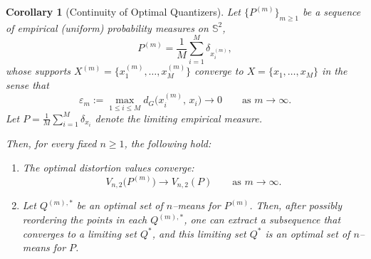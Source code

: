 \documentclass[12pt, reqno]{amsart}
\theoremstyle{plain}
\newtheorem{corollary}[subsection]{Corollary}
\theoremstyle{definition}
\begin{document}
\begin{corollary}[Continuity of Optimal Quantizers]\label{cor:continuity-optimal}
Let $\{P^{(m)}\}_{m\ge 1}$ be a sequence of empirical (uniform) probability measures on $\mathbb{S}^2$,
\[
P^{(m)}=\frac{1}{M}\sum_{i=1}^{M}\delta_{x^{(m)}_{i}},
\]
whose supports $X^{(m)}=\{x^{(m)}_1,\dots,x^{(m)}_M\}$ converge to
$X=\{x_1,\dots,x_M\}$ in the sense that
\[
\varepsilon_m := \max_{1\le i\le M} d_G\big(x^{(m)}_{i},\,x_{i}\big) \longrightarrow 0 
\qquad \text{as } m\to\infty.
\]
Let $P=\frac{1}{M}\sum_{i=1}^{M}\delta_{x_i}$ denote the limiting empirical measure.

Then, for every fixed $n\ge 1$, the following hold:

\begin{enumerate}\itemsep6pt
\item The optimal distortion values converge:
\[
V_{n,2}\big(P^{(m)}\big) \longrightarrow V_{n,2}(P) \qquad \text{as } m\to\infty.
\]

\item Let $Q^{(m),*}$ be an optimal set of $n$–means for $P^{(m)}$. 
Then, after possibly reordering the points in each $Q^{(m),*}$, one can extract a subsequence 
that converges to a limiting set $Q^{*}$, and this limiting set $Q^{*}$ is an optimal set of $n$–means for $P$.
\end{enumerate}
\end{corollary}
\end{document}
